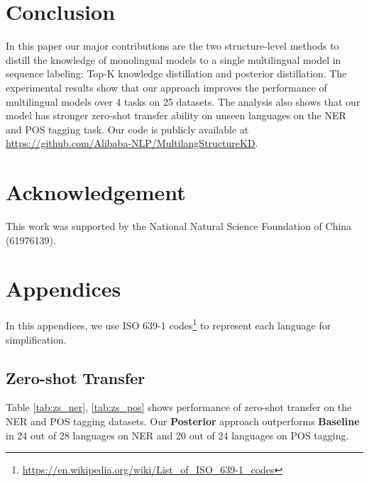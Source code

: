 \documentclass[11pt,a4paper]{article}
\begin{document}
\section{Conclusion}
In this paper our major contributions are the two structure-level methods to distill the knowledge of monolingual models to a single multilingual model in sequence labeling: Top-K knowledge distillation and posterior distillation.
The experimental results show that our approach improves the performance of multilingual models over 4 tasks on 25 datasets. 
The analysis also shows that our model has stronger zero-shot transfer ability on unseen languages on the NER and POS tagging task. Our code is publicly available at \url{https://github.com/Alibaba-NLP/MultilangStructureKD}.
\section*{Acknowledgement}
This work was supported by the National Natural Science Foundation of China (61976139).



\appendix
\section{Appendices}
\label{sec:supplemental}
In this appendices, we use ISO 639-1 codes\footnote{\url{https://en.wikipedia.org/wiki/List_of_ISO_639-1_codes}} to represent each language for simplification.


\subsection{Zero-shot Transfer}
Table \ref{tab:zs_ner}, \ref{tab:zs_pos} shows performance of zero-shot transfer on the NER and POS tagging datasets. Our \textbf{Posterior} approach outperforms \textbf{Baseline} in 24 out of 28 languages on NER and 20 out of 24 languages on POS tagging.
\end{document}
